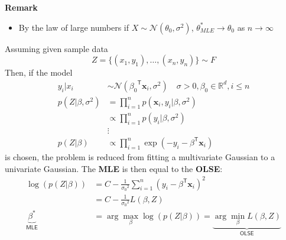 \textbf{Remark}
\begin{itemize}
    \item By the law of large numbers if $X\sim \mathcal{N}(\theta_0, \sigma^2)$, $\theta^*_{MLE}\to\theta_0$ as $n\to\infty$
\end{itemize}

\begin{examplesection}\label{MLE_simp}
    Assuming given sample data
    \begin{equation*}
        Z=\{(x_1,y_1),\dots,(x_n,y_n)\} \sim F
    \end{equation*}
    Then, if the model
    \noindent\begin{align*}
        y_i|x_i             & \sim \mathcal{N}({\beta_0}^{\mathsf{T}}\mathbf{x}_i, \sigma^2)\quad \sigma>0, \beta_0\in \mathbb{R}^d, i\leq n \\
        p(Z|\beta,\sigma^2) & = \prod\limits_{i=1}^n p(\mathbf{x}_i,y_i|\beta,\sigma^2)                                                      \\
                            & \propto \prod\limits_{i=1}^n p(y_i|\beta,\sigma^2)                                                             \\
                            & \vdots                                                                                                         \\
        p(Z|\beta)          & \propto \prod\limits_{i=1}^n \exp\left(-y_i -\beta^{\mathsf{T}}\mathbf{x}_i\right)
    \end{align*}
    is chosen, the problem is reduced from fitting a multivariate Gaussian to a univariate Gaussian. The \textbf{MLE} is then equal to the \textbf{OLSE}:
    \noindent\begin{align*}
        \log(p(Z|\beta))                    & = C -\frac{1}{{\sigma_0}^2}\sum_{i=1}^{n} {(y_i-\beta^{\mathsf{T}}\mathbf{x}_i)}^2          \\
                                            & =C - \frac{1}{{\sigma_0}^2}L(\beta,Z)                                                       \\
        \underbrace{\beta^*}_{\textsf{MLE}} & = \arg\max_\beta \log(p(Z|\beta)) = \underbrace{\arg\min_\beta L(\beta, Z)}_{\textsf{OLSE}}
    \end{align*}
\end{examplesection}

